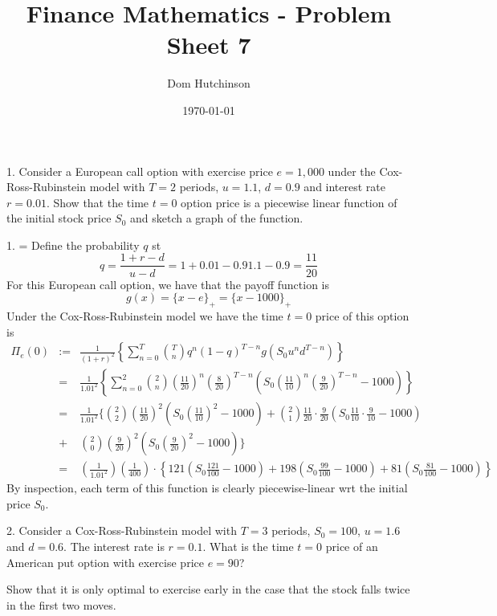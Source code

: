 \documentclass[11pt,a4paper]{article}
\begin{document}
\questionsfalse

\title{Finance Mathematics - Problem Sheet 7}
\author{Dom Hutchinson}
\date{\today}
\maketitle

\begin{question}{1.}
  Consider a European call option with exercise price $e=1,000$ under the Cox-Ross-Rubinstein model with $T=2$ periods, $u=1.1$, $d=0.9$ and interest rate $r=0.01$. Show that the time $t=0$ option price is a piecewise linear function of the initial stock price $S_0$ and sketch a graph of the function.
\end{question}

\begin{answer}{1.}
  \everymath={\displaystyle}
  Define the probability $q$ st
  \[ q=\frac{1+r-d}{u-d}={1+0.01-0.9}{1.1-0.9}=\frac{11}{20} \]
  For this European call option, we have that the payoff function is
  \[ g(x)=\{x-e\}_+=\{x-1000\}_+ \]
  Under the Cox-Ross-Rubinstein model we have the time $t=0$ price of this option is
  \[\begin{array}{rrl}
    \Pi_e(0)&:=&\frac{1}{(1+r)^2}\left\{\sum_{n=0}^T{T\choose n}q^n(1-q)^{T-n}g(S_0u^nd^{T-n})\right\}\\
    &=&\frac1{1.01^2}\left\{\sum_{n=0}^2{2\choose n}\left(\frac{11}{20}\right)^n\left(\frac{8}{20}\right)^{T-n}\left(S_0\left(\frac{11}{10}\right)^n\left(\frac{9}{20}\right)^{T-n}-1000\right)\right\}\\
    &=&\frac1{1.01^2}\Bigg\{{2\choose2}\left(\frac{11}{20}\right)^2\left(S_0\left(\frac{11}{10}\right)^2-1000\right)+{2\choose1}\frac{11}{20}\cdot\frac{9}{20}\left(S_0\frac{11}{10}\cdot\frac9{10}-1000\right)\\
    &+&{2\choose0}\left(\frac{9}{20}\right)^2\left(S_0\left(\frac{9}{20}\right)^2-1000\right)\Bigg\}\\
    &=&\left(\frac{1}{1.01^2}\right)\left(\frac1{400}\right)\cdot\left\{121\left(S_0\frac{121}{100}-1000\right)+198\left(S_0\frac{99}{100}-1000\right)+81\left(S_0\frac{81}{100}-1000\right)\right\}
  \end{array}\]
  By inspection, each term of this function is clearly piecewise-linear wrt the initial price $S_0$.
\end{answer}

\begin{question}{2.}
  Consider a Cox-Ross-Rubinstein model with $T=3$ periods, $S_0=100$, $u=1.6$ and $d=0.6$. The interest rate is $r=0.1$. What is the time $t=0$ price of an American put option with exercise price $e=90$?
  \par Show that it is only optimal to exercise early in the case that the stock falls twice in the first two moves.
\end{question}
\end{document}
